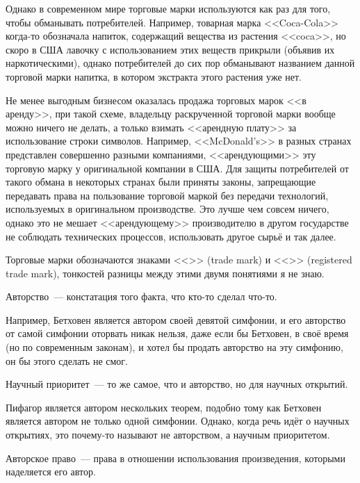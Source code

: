 Однако в современном мире торговые марки используются как раз для того, чтобы обманывать потребителей. 
Например, товарная марка <<Coca-Cola>> когда-то обозначала напиток, содержащий вещества из растения <<coca>>, но скоро в США лавочку с использованием этих веществ прикрыли (объявив их наркотическими), однако потребителей до сих пор обманывают названием данной торговой марки напитка, в котором экстракта этого растения уже нет.

Не менее выгодным бизнесом оказалась продажа торговых марок <<в аренду>>, при такой схеме, владельцу раскрученной торговой марки вообще можно ничего не делать, а только взимать <<арендную плату>> за использование строки символов.
Например, <<McDonald's>> в разных странах представлен совершенно разными компаниями, <<арендующими>> эту торговую марку у оригинальной компании в США.
Для защиты потребителей от такого обмана в некоторых странах были приняты законы, запрещающие передавать права на пользование торговой маркой без передачи технологий, используемых в оригинальном производстве.
Это лучше чем совсем ничего, однако это не мешает <<арендующему>> производителю в другом государстве не соблюдать технических процессов, использовать другое сырьё и так далее.

Торговые марки обозначаются знаками <<\texttrademark>> (trade mark) и <<\textregistered>> (registered trade mark), тонкостей разницы между этими двумя понятиями я не знаю.

\begin{definition}
Авторство~--- констатация того факта, что кто-то сделал что-то.
\end{definition}

Например, Бетховен является автором своей девятой симфонии, и его авторство от самой симфонии оторвать никак нельзя, даже если бы Бетховен, в своё время (но по современным законам), и хотел бы продать авторство на эту симфонию, он бы этого сделать не смог.

\begin{definition}
Научный приоритет~--- то же самое, что и авторство, но для научных открытий.
\end{definition}

Пифагор является автором нескольких теорем, подобно тому как Бетховен является автором не только одной симфонии.
Однако, когда речь идёт о научных открытиях, это почему-то называют не авторством, а научным приоритетом.

\begin{definition}
Авторское право~--- права в отношении использования произведения, которыми наделяется его автор.
\end{definition}

